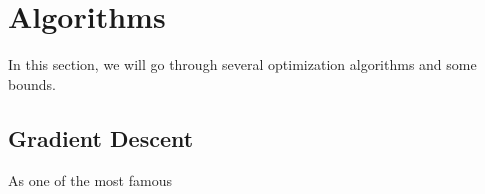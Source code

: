 \chapter{Algorithms}

In this section, we will go through several optimization algorithms and some bounds.

\section{Gradient Descent}
As one of the most famous 